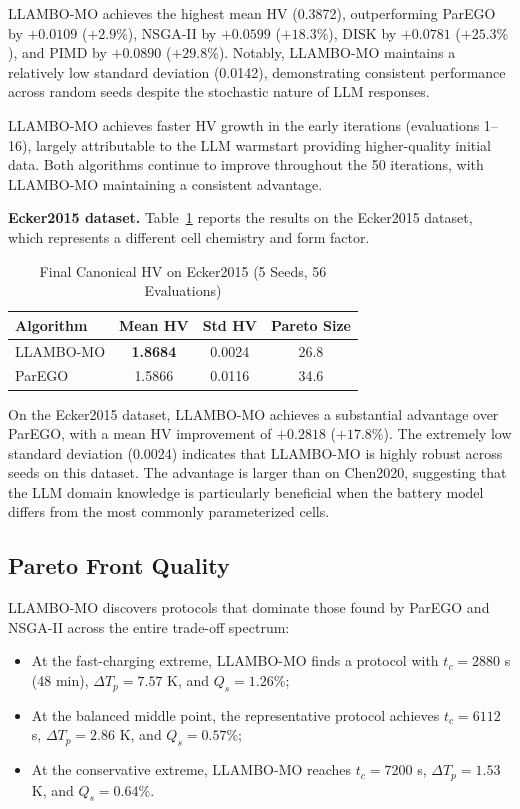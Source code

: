 \documentclass[lettersize,journal]{IEEEtran}
\begin{document}
LLAMBO-MO achieves the highest mean HV (0.3872), outperforming ParEGO by $+0.0109$ ($+2.9\%$), NSGA-II by $+0.0599$ ($+18.3\%$), DISK by $+0.0781$ ($+25.3\%$), and PIMD by $+0.0890$ ($+29.8\%$). Notably, LLAMBO-MO maintains a relatively low standard deviation (0.0142), demonstrating consistent performance across random seeds despite the stochastic nature of LLM responses.

LLAMBO-MO achieves faster HV growth in the early iterations (evaluations 1--16), largely attributable to the LLM warmstart providing higher-quality initial data. Both algorithms continue to improve throughout the 50 iterations, with LLAMBO-MO maintaining a consistent advantage.

\textbf{Ecker2015 dataset.} Table~\ref{tab:hv_ecker} reports the results on the Ecker2015 dataset, which represents a different cell chemistry and form factor.

\begin{table}[!t]
\caption{Final Canonical HV on Ecker2015 (5 Seeds, 56 Evaluations)}
\label{tab:hv_ecker}
\centering
\begin{tabular}{lccc}
\toprule
Algorithm & Mean HV & Std HV & Pareto Size \\
\midrule
LLAMBO-MO & \textbf{1.8684} & 0.0024 & 26.8 \\
ParEGO    & 1.5866 & 0.0116 & 34.6 \\
\bottomrule
\end{tabular}
\end{table}

On the Ecker2015 dataset, LLAMBO-MO achieves a substantial advantage over ParEGO, with a mean HV improvement of $+0.2818$ ($+17.8\%$). The extremely low standard deviation (0.0024) indicates that LLAMBO-MO is highly robust across seeds on this dataset. The advantage is larger than on Chen2020, suggesting that the LLM domain knowledge is particularly beneficial when the battery model differs from the most commonly parameterized cells.

\subsection{Pareto Front Quality}

LLAMBO-MO discovers protocols that dominate those found by ParEGO and NSGA-II across the entire trade-off spectrum:
\begin{itemize}
\item At the fast-charging extreme, LLAMBO-MO finds a protocol with $t_c = 2880$ s (48 min), $\Delta T_p = 7.57$ K, and $Q_s = 1.26\%$;
\item At the balanced middle point, the representative protocol achieves $t_c = 6112$ s, $\Delta T_p = 2.86$ K, and $Q_s = 0.57\%$;
\item At the conservative extreme, LLAMBO-MO reaches $t_c = 7200$ s, $\Delta T_p = 1.53$ K, and $Q_s = 0.64\%$.
\end{itemize}
\end{document}
